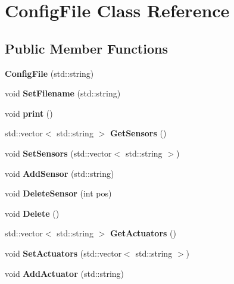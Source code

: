 \section{Config\+File Class Reference}
\label{class_config_file}
\subsection*{Public Member Functions}
\begin{DoxyCompactItemize}
\item 
{\bfseries Config\+File} (std\+::string)\label{class_config_file_a8c95653c735ea467791f133b8a316e60}

\item 
void {\bfseries Set\+Filename} (std\+::string)\label{class_config_file_a96b1e9e5f481d1788893923a28b204c7}

\item 
void {\bfseries print} ()\label{class_config_file_a4a9c2fead27d46c5b2fb4ba859c3764d}

\item 
std\+::vector$<$ std\+::string $>$ {\bfseries Get\+Sensors} ()\label{class_config_file_adf33bff643351fc671968a4802ef0c96}

\item 
void {\bfseries Set\+Sensors} (std\+::vector$<$ std\+::string $>$)\label{class_config_file_aa1013df2be28dcd69fbab7e6ef831ae9}

\item 
void {\bfseries Add\+Sensor} (std\+::string)\label{class_config_file_ae949075ae5533a17145a5418a48e6f5d}

\item 
void {\bfseries Delete\+Sensor} (int pos)\label{class_config_file_ad4f2172e053202d662a250b30b470a6b}

\item 
void {\bfseries Delete} ()\label{class_config_file_a45a9814ceae89d422358e139b2b02306}

\item 
std\+::vector$<$ std\+::string $>$ {\bfseries Get\+Actuators} ()\label{class_config_file_ae4e42aad8350ae2873caa48927b77ac9}

\item 
void {\bfseries Set\+Actuators} (std\+::vector$<$ std\+::string $>$)\label{class_config_file_ab6bd8e6ca24be45ddee787f488511100}

\item 
void {\bfseries Add\+Actuator} (std\+::string)\label{class_config_file_a481486cc677e118e9174cb5da7332584}


\end{DoxyCompactItemize}

